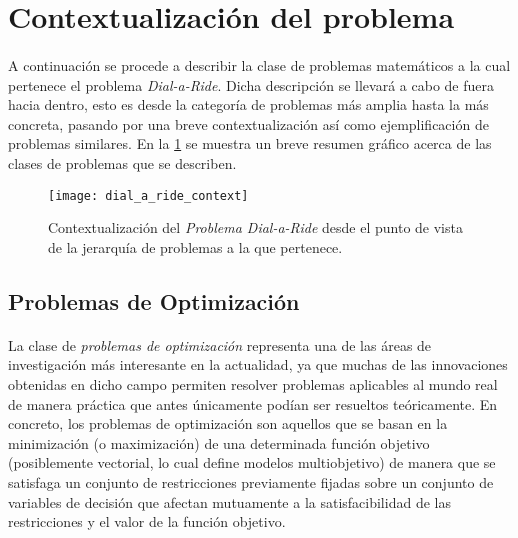 \documentclass{subfiles}
\begin{document}
    \section{Contextualización del problema}
    \label{sec:formulation_contextualization}

      \paragraph{}
      A continuación se procede a describir la clase de problemas matemáticos a la cual pertenece el problema \emph{Dial-a-Ride}. Dicha descripción se llevará a cabo de fuera hacia dentro, esto es desde la categoría de problemas más amplia hasta la más concreta, pasando por una breve contextualización así como ejemplificación de problemas similares. En la \cref{img:formulation_dial_a_ride_contextualization} se muestra un breve resumen gráfico acerca de las clases de problemas que se describen.

      \begin{figure}[ht]
        \centering
        \texttt{[image: dial\_a\_ride\_context]}
        \caption{Contextualización del \emph{Problema Dial-a-Ride} desde el punto de vista de la jerarquía de problemas a la que pertenece.}
        \label{img:formulation_dial_a_ride_contextualization}
      \end{figure}

      \subsection{Problemas de Optimización}
      \label{sec:formulation_optimization_problems}

        \paragraph{}
        La clase de \emph{problemas de optimización} representa una de las áreas de investigación más interesante en la actualidad, ya que muchas de las innovaciones obtenidas en dicho campo permiten resolver problemas aplicables al mundo real de manera práctica que antes únicamente podían ser resueltos teóricamente. En concreto, los problemas de optimización son aquellos que se basan en la minimización (o maximización) de una determinada función objetivo (posiblemente vectorial, lo cual define modelos multiobjetivo) de manera que se satisfaga un conjunto de restricciones previamente fijadas sobre un conjunto de variables de decisión que afectan mutuamente a la satisfacibilidad de las restricciones y el valor de la función objetivo.
\end{document}
